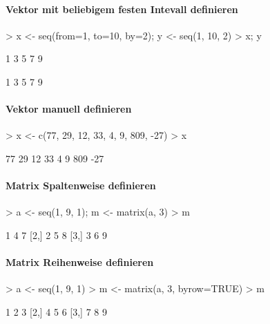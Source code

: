 \paragraph{Vektor mit beliebigem festen Intevall definieren}
\begin{Schunk}
\begin{Sinput}
> x <- seq(from=1, to=10, by=2); y <- seq(1, 10, 2)
> x; y
\end{Sinput}
\begin{Soutput}
[1] 1 3 5 7 9
\end{Soutput}
\begin{Soutput}
[1] 1 3 5 7 9
\end{Soutput}
\end{Schunk}

\paragraph{Vektor manuell definieren}
\begin{Schunk}
\begin{Sinput}
> x <- c(77, 29, 12, 33, 4, 9, 809, -27)
> x
\end{Sinput}
\begin{Soutput}
[1]  77  29  12  33   4   9 809 -27
\end{Soutput}
\end{Schunk}

\paragraph{Matrix Spaltenweise definieren}
\begin{Schunk}
\begin{Sinput}
> a <- seq(1, 9, 1); m <- matrix(a, 3)
> m
\end{Sinput}
\begin{Soutput}
     [,1] [,2] [,3]
[1,]    1    4    7
[2,]    2    5    8
[3,]    3    6    9
\end{Soutput}
\end{Schunk}

\paragraph{Matrix Reihenweise definieren}
\begin{Schunk}
\begin{Sinput}
> a <- seq(1, 9, 1)
> m <- matrix(a, 3, byrow=TRUE)
> m
\end{Sinput}
\begin{Soutput}
     [,1] [,2] [,3]
[1,]    1    2    3
[2,]    4    5    6
[3,]    7    8    9
\end{Soutput}
\end{Schunk}

